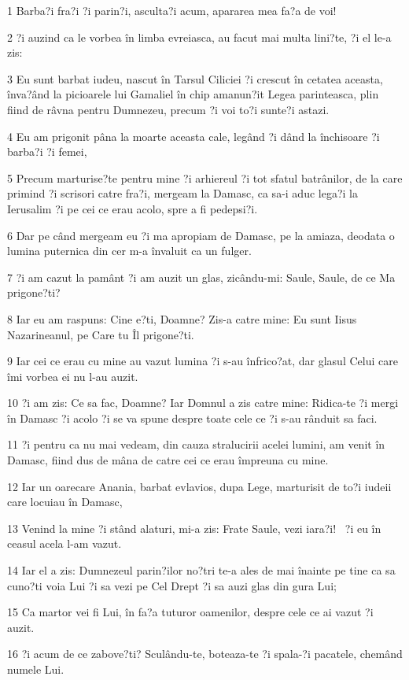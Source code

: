 \par 1 Barba?i fra?i ?i parin?i, asculta?i acum, apararea mea fa?a de voi!
\par 2 ?i auzind ca le vorbea în limba evreiasca, au facut mai multa lini?te, ?i el le-a zis:
\par 3 Eu sunt barbat iudeu, nascut în Tarsul Ciliciei ?i crescut în cetatea aceasta, înva?ând la picioarele lui Gamaliel în chip amanun?it Legea parinteasca, plin fiind de râvna pentru Dumnezeu, precum ?i voi to?i sunte?i astazi.
\par 4 Eu am prigonit pâna la moarte aceasta cale, legând ?i dând la închisoare ?i barba?i ?i femei,
\par 5 Precum marturise?te pentru mine ?i arhiereul ?i tot sfatul batrânilor, de la care primind ?i scrisori catre fra?i, mergeam la Damasc, ca sa-i aduc lega?i la Ierusalim ?i pe cei ce erau acolo, spre a fi pedepsi?i.
\par 6 Dar pe când mergeam eu ?i ma apropiam de Damasc, pe la amiaza, deodata o lumina puternica din cer m-a învaluit ca un fulger.
\par 7 ?i am cazut la pamânt ?i am auzit un glas, zicându-mi: Saule, Saule, de ce Ma prigone?ti?
\par 8 Iar eu am raspuns: Cine e?ti, Doamne? Zis-a catre mine: Eu sunt Iisus Nazarineanul, pe Care tu Îl prigone?ti.
\par 9 Iar cei ce erau cu mine au vazut lumina ?i s-au înfrico?at, dar glasul Celui care îmi vorbea ei nu l-au auzit.
\par 10 ?i am zis: Ce sa fac, Doamne? Iar Domnul a zis catre mine: Ridica-te ?i mergi în Damasc ?i acolo ?i se va spune despre toate cele ce ?i s-au rânduit sa faci.
\par 11 ?i pentru ca nu mai vedeam, din cauza stralucirii acelei lumini, am venit în Damasc, fiind dus de mâna de catre cei ce erau împreuna cu mine.
\par 12 Iar un oarecare Anania, barbat evlavios, dupa Lege, marturisit de to?i iudeii care locuiau în Damasc,
\par 13 Venind la mine ?i stând alaturi, mi-a zis: Frate Saule, vezi iara?i!  ?i eu în ceasul acela l-am vazut.
\par 14 Iar el a zis: Dumnezeul parin?ilor no?tri te-a ales de mai înainte pe tine ca sa cuno?ti voia Lui ?i sa vezi pe Cel Drept ?i sa auzi glas din gura Lui;
\par 15 Ca martor vei fi Lui, în fa?a tuturor oamenilor, despre cele ce ai vazut ?i auzit.
\par 16 ?i acum de ce zabove?ti? Sculându-te, boteaza-te ?i spala-?i pacatele, chemând numele Lui.
